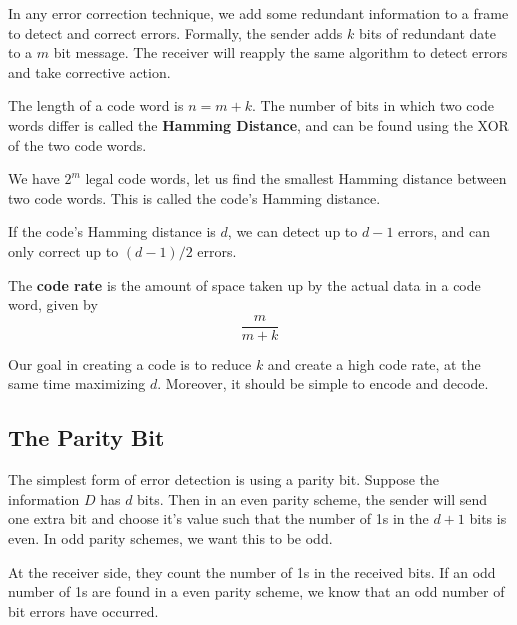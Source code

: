 \documentclass[12pt,letterpaper]{book}
\theoremstyle{definition}
\begin{document}
In any error correction technique, we add some redundant information to a frame to detect and correct errors. Formally, the sender adds $k$ bits of redundant date to a $m$ bit message. The receiver will reapply the same algorithm to detect errors and take corrective action.

The length of a code word is $n = m+k$. The number of bits in which two code words differ is called the \textbf{Hamming Distance}, and can be found using the XOR of the two code words.

We have $2^m$ legal code words, let us find the smallest Hamming distance between two code words. This is called the code's Hamming distance.

If the code's Hamming distance is $d$, we can detect up to $d-1$ errors, and can only correct up to $(d-1)/2$ errors.

The \textbf{code rate} is the amount of space taken up by the actual data in a code word, given by
\[\frac{m}{m+k}\]

Our goal in creating a code is to reduce $k$ and create a high code rate, at the same time maximizing $d$. Moreover, it should be simple to encode and decode.

\subsection{The Parity Bit}

The simplest form of error detection is using a parity bit. Suppose the information $D$  has $d$ bits. Then in an even parity scheme, the sender will send one extra bit and choose it's value such that the number of 1s in the $d+1$ bits is even. In odd parity schemes, we want this to be odd.

At the receiver side, they count the number of 1s in the received bits. If an odd number of 1s are found in a even parity scheme, we know that an odd number of bit errors have occurred.
\end{document}
